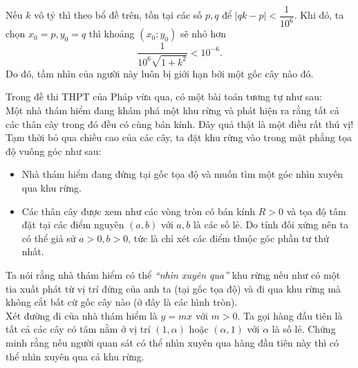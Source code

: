 \begin{bt}
{\begin{center}
		\end{center}
		Nếu $ k $ vô tỷ thì theo bổ đề trên, tồn tại các số $ p,q $ để $ |qk-p|<\dfrac{1}{10^6} $. Khi đó, ta chọn $ x_0=p,y_0=q $ thì khoảng $(x_0;y_0)$ sẽ nhỏ hơn $$ \dfrac{1}{10^6\sqrt{1+k^2}}<10^{-6}. $$
		Do đó, tầm nhìn của người này luôn bị giới hạn bởi một gốc cây nào đó.
		\begin{nx}
			Trong đề thi THPT của Pháp vừa qua, có một bài toán tương tự như sau: \\
			Một nhà thám hiểm đang khám phá một khu rừng và phát hiện ra rằng tất cả các thân cây trong
			đó đều có cùng bán kính. Đây quả thật là một điều rất thú vị! Tạm thời bỏ qua chiều cao của các cây, ta đặt khu rừng vào trong mặt phẳng tọa độ vuông góc như sau:
			\begin{itemize}
				\item Nhà thám hiểm đang đứng tại gốc tọa độ và muốn tìm một góc nhìn xuyên qua khu rừng.
				\item Các thân cây được xem như các vòng tròn có bán kính $ R>0 $ và tọa độ tâm đặt tại các	điểm nguyên $ (a,b) $ với $ a,b $ là các số lẻ. Do tính đối xứng nên ta có thể giả sử $ a>0,b>0 $, tức là chỉ xét các điểm thuộc góc phần tư thứ nhất.
			\end{itemize}
			Ta nói rằng nhà thám hiểm có thể \textit{“nhìn xuyên qua”} khu rừng nếu như có một tia xuất phát từ vị trí đứng của anh ta (tại gốc tọa độ) và đi qua khu rừng mà không cắt bất cứ gốc cây nào (ở đây là các hình tròn). \\
			Xét đường đi của nhà thám hiểm là $ y=mx $ với $ m>0 $. Ta gọi hàng đầu tiên là tất cả các cây
			có tâm nằm ở vị trí $ (1,\alpha) $ hoặc $ (\alpha,1) $ với $ \alpha $ là số lẻ. Chứng minh rằng nếu người quan sát có thể nhìn xuyên qua hàng đầu tiên này thì có thể nhìn xuyên qua cả khu rừng.
		\end{nx}
	}
\end{bt}

